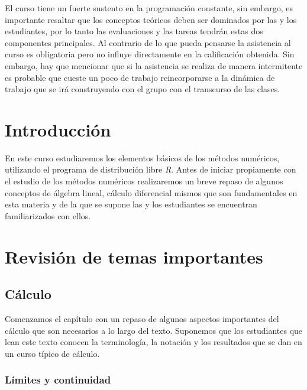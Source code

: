 \documentclass[12pt]{article}
\begin{document}
El curso tiene un fuerte sustento en la programación constante, sin embargo, es importante resaltar que los conceptos teóricos deben ser dominados por las y los estudiantes, por lo tanto las evaluaciones y las tareas tendrán estas dos componentes principales.  Al contrario de lo que pueda pensarse la asistencia al curso es obligatoria pero no influye directamente en la calificación obtenida.  Sin embargo,  hay que mencionar que si la asistencia se realiza de manera intermitente es probable que cueste un poco de trabajo reincorporarse a la dinámica de trabajo que se irá construyendo con el grupo con el transcurso de las clases. 

\section{Introducción}

En este curso estudiaremos los elementos básicos de los métodos numéricos, utilizando el programa de distribución libre \textit{R}. Antes de iniciar propiamente con el estudio de los métodos numéricos realizaremos un breve repaso de algunos conceptos de álgebra lineal, cálculo diferencial mismos que son fundamentales en esta materia y de la que se supone las y los estudiantes se encuentran familiarizados con ellos.

\section{Revisión de temas importantes}

\subsection{Cálculo}

Comenzamos el capítulo con un repaso de algunos aspectos importantes del cálculo que son necesarios a lo largo del texto. Suponemos que los estudiantes que lean este texto conocen la terminología, la notación y los resultados que se dan en un curso típico de cálculo.

\subsubsection{Límites y continuidad}
\end{document}
